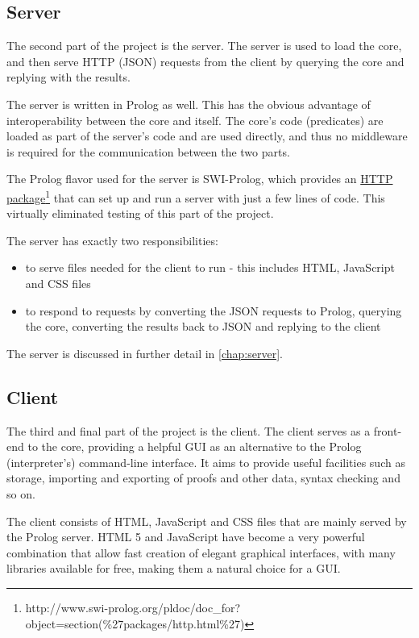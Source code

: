 \documentclass[11pt,twoside,a4paper]{report}
\begin{document}
\subsection{Server}
The second part of the project is the server. The server is used to load the core, and then serve HTTP (JSON) requests from the client by querying the core and replying with the results.

The server is written in Prolog as well. This has the obvious advantage of interoperability between the core and itself. The core's code (predicates) are loaded as part of the server's code and are used directly, and thus no middleware is required for the communication between the two parts.

The Prolog flavor used for the server is SWI-Prolog, which provides an \href{http://www.swi-prolog.org/pldoc/doc_for?object=section(\%27packages/http.html\%27)}{HTTP package}\footnote{http://www.swi-prolog.org/pldoc/doc\_for?object=section(\%27packages/http.html\%27)} that can set up and run a server with just a few lines of code. This virtually eliminated testing of this part of the project.

The server has exactly two responsibilities:

\begin{itemize}
\item
to serve files needed for the client to run - this includes HTML, JavaScript and CSS files
\item
to respond to requests by converting the JSON requests to Prolog, querying the core, converting the results back to JSON and replying to the client
\end{itemize}

The server is discussed in further detail in \autoref{chap:server}.

\subsection{Client}
The third and final part of the project is the client. The client serves as a front-end to the core, providing a helpful GUI as an alternative to the Prolog (interpreter's) command-line interface. It aims to provide useful facilities such as storage, importing and exporting of proofs and other data, syntax checking and so on.

The client consists of HTML, JavaScript and CSS files that are mainly served by the Prolog server. HTML 5 and JavaScript have become a very powerful combination that allow fast creation of elegant graphical interfaces, with many libraries available for free, making them a natural choice for a GUI.
\end{document}
